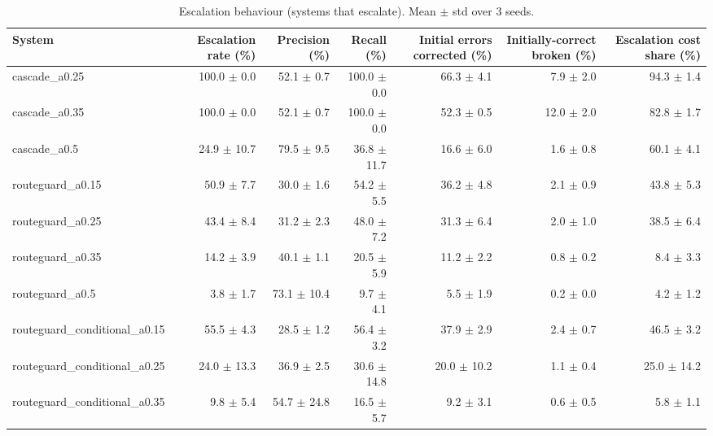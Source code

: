 \begin{table}[t]
\centering
\small
\caption{Escalation behaviour (systems that escalate). Mean $\pm$ std over 3 seeds.}
\label{tab:escalation}
\begin{tabular}{lrrrrrr}
\toprule
System & Escalation rate (\%) & Precision (\%) & Recall (\%) & Initial errors corrected (\%) & Initially-correct broken (\%) & Escalation cost share (\%) \\
\midrule
cascade\_a0.25 & 100.0 $\pm$ 0.0 & 52.1 $\pm$ 0.7 & 100.0 $\pm$ 0.0 & 66.3 $\pm$ 4.1 & 7.9 $\pm$ 2.0 & 94.3 $\pm$ 1.4 \\
cascade\_a0.35 & 100.0 $\pm$ 0.0 & 52.1 $\pm$ 0.7 & 100.0 $\pm$ 0.0 & 52.3 $\pm$ 0.5 & 12.0 $\pm$ 2.0 & 82.8 $\pm$ 1.7 \\
cascade\_a0.5 & 24.9 $\pm$ 10.7 & 79.5 $\pm$ 9.5 & 36.8 $\pm$ 11.7 & 16.6 $\pm$ 6.0 & 1.6 $\pm$ 0.8 & 60.1 $\pm$ 4.1 \\
routeguard\_a0.15 & 50.9 $\pm$ 7.7 & 30.0 $\pm$ 1.6 & 54.2 $\pm$ 5.5 & 36.2 $\pm$ 4.8 & 2.1 $\pm$ 0.9 & 43.8 $\pm$ 5.3 \\
routeguard\_a0.25 & 43.4 $\pm$ 8.4 & 31.2 $\pm$ 2.3 & 48.0 $\pm$ 7.2 & 31.3 $\pm$ 6.4 & 2.0 $\pm$ 1.0 & 38.5 $\pm$ 6.4 \\
routeguard\_a0.35 & 14.2 $\pm$ 3.9 & 40.1 $\pm$ 1.1 & 20.5 $\pm$ 5.9 & 11.2 $\pm$ 2.2 & 0.8 $\pm$ 0.2 & 8.4 $\pm$ 3.3 \\
routeguard\_a0.5 & 3.8 $\pm$ 1.7 & 73.1 $\pm$ 10.4 & 9.7 $\pm$ 4.1 & 5.5 $\pm$ 1.9 & 0.2 $\pm$ 0.0 & 4.2 $\pm$ 1.2 \\
routeguard\_conditional\_a0.15 & 55.5 $\pm$ 4.3 & 28.5 $\pm$ 1.2 & 56.4 $\pm$ 3.2 & 37.9 $\pm$ 2.9 & 2.4 $\pm$ 0.7 & 46.5 $\pm$ 3.2 \\
routeguard\_conditional\_a0.25 & 24.0 $\pm$ 13.3 & 36.9 $\pm$ 2.5 & 30.6 $\pm$ 14.8 & 20.0 $\pm$ 10.2 & 1.1 $\pm$ 0.4 & 25.0 $\pm$ 14.2 \\
routeguard\_conditional\_a0.35 & 9.8 $\pm$ 5.4 & 54.7 $\pm$ 24.8 & 16.5 $\pm$ 5.7 & 9.2 $\pm$ 3.1 & 0.6 $\pm$ 0.5 & 5.8 $\pm$ 1.1 \\
\bottomrule
\end{tabular}
\end{table}
